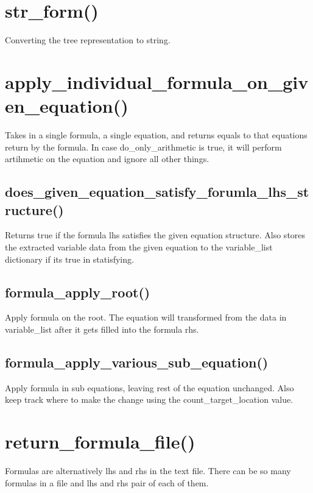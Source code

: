 \documentclass{book}
\begin{document}
\section{str\_form()}

Converting the tree representation to string.

\section{apply\_individual\_formula\_on\_given\_equation()}

Takes in a single formula, a single equation, and returns equals to that equations return by the formula. In case do\_only\_arithmetic is true, it will perform artihmetic on the equation and ignore all other things.

\subsection{does\_given\_equation\_satisfy\_forumla\_lhs\_structure()}

Returns true if the formula lhs satisfies the given equation structure. Also stores the extracted variable data from the given equation to the variable\_list dictionary if its true in statisfying.

\subsection{formula\_apply\_root()}

Apply formula on the root. The equation will transformed from the data in variable\_list after it gets filled into the formula rhs.

\subsection{formula\_apply\_various\_sub\_equation()}

Apply formula in sub equations, leaving rest of the equation unchanged. Also keep track where to make the change using the count\_target\_location value.

\section{return\_formula\_file()}

Formulas are alternatively lhs and rhs in the text file. There can be so many formulas in a file and lhs and rhs pair of each of them.
\end{document}
